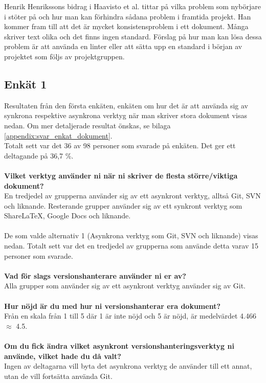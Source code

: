 Henrik Henrikssons bidrag i Haavisto et al. \cite{Haavisto954095} tittar på vilka problem som nybörjare i \latex stöter på och hur man kan förhindra sådana problem i framtida projekt. Han kommer fram till att det är mycket konsistensproblem i ett \latex dokument. Många skriver text olika och det finns ingen standard. Förslag på hur man kan lösa dessa problem är att använda en linter eller att sätta upp en standard i början av projektet som följs av projektgruppen.

\subsection{Enkät 1}
Resultaten från den första enkäten, enkäten om hur det är att använda sig av synkrona respektive asynkrona verktyg när man skriver stora dokument visas nedan. Om mer detaljerade resultat önskas, se bilaga \ref{appendix:svar_enkat_dokument}.\\
Totalt sett var det 36 av 98 personer som svarade på enkäten. Det ger ett deltagande på 36,7 \%.\\
\\\textbf{Vilket verktyg använder ni när ni skriver de flesta större/viktiga dokument?}\\
En tredjedel av grupperna använder sig av ett asynkront verktyg, alltså Git, SVN och liknande. Resterande grupper använder sig av ett synkront verktyg som ShareLaTeX, Google Docs och liknande.\\\\
De som valde alternativ 1 (Asynkrona verktyg som Git, SVN och liknande) visas nedan. Totalt sett var det en tredjedel av grupperna som använde detta varav 15 personer som svarade.\\\\
\textbf{Vad för slags versionshanterare använder ni er av?}\\
Alla grupper som använder sig av ett asynkront verktyg använder sig av Git.\\\\
\textbf{Hur nöjd är du med hur ni versionshanterar era dokument?}\\
Från en skala från 1 till 5 där 1 är inte nöjd och 5 är nöjd, är medelvärdet 4.466 $\approx$ 4.5.\\\\
\textbf{Om du fick ändra vilket asynkront versionshanteringsverktyg ni använde, vilket hade du då valt?}\\
Ingen av deltagarna vill byta det asynkrona verktyg de använder till ett annat, utan de vill fortsätta använda Git.\\\\
